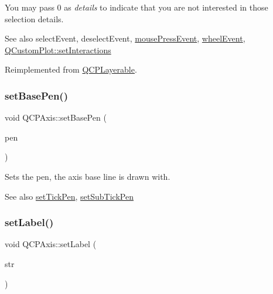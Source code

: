 You may pass 0 as {\itshape details} to indicate that you are not interested in those selection details.

\begin{DoxySeeAlso}{See also}
select\+Event, deselect\+Event, \hyperlink{class_q_c_p_layerable_af6567604818db90f4fd52822f8bc8376}{mouse\+Press\+Event}, \hyperlink{class_q_c_p_layerable_a47dfd7b8fd99c08ca54e09c362b6f022}{wheel\+Event}, \hyperlink{class_q_custom_plot_a5ee1e2f6ae27419deca53e75907c27e5}{Q\+Custom\+Plot\+::set\+Interactions} 
\end{DoxySeeAlso}


Reimplemented from \hyperlink{class_q_c_p_layerable_a04db8351fefd44cfdb77958e75c6288e}{Q\+C\+P\+Layerable}.

\mbox{\label{class_q_c_p_axis_a778d45fb71b3c7ab3bb7079e18b058e4}} 
\subsubsection{\texorpdfstring{set\+Base\+Pen()}{setBasePen()}}
{\footnotesize\ttfamily void Q\+C\+P\+Axis\+::set\+Base\+Pen (\begin{DoxyParamCaption}\item[{const Q\+Pen \&}]{pen }\end{DoxyParamCaption})}

Sets the pen, the axis base line is drawn with.

\begin{DoxySeeAlso}{See also}
\hyperlink{class_q_c_p_axis_ad80923bcc1c5da4c4db602c5325e797e}{set\+Tick\+Pen}, \hyperlink{class_q_c_p_axis_aede4028ae7516bd51a60618a8233f9cf}{set\+Sub\+Tick\+Pen} 
\end{DoxySeeAlso}
\mbox{\label{class_q_c_p_axis_a33bcc382c111c9f31bb0687352a2dea4}} 
\subsubsection{\texorpdfstring{set\+Label()}{setLabel()}}
{\footnotesize\ttfamily void Q\+C\+P\+Axis\+::set\+Label (\begin{DoxyParamCaption}\item[{const Q\+String \&}]{str }\end{DoxyParamCaption})}

